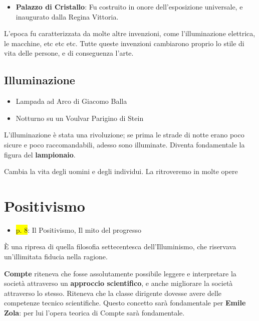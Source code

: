 \documentclass{book}
\newcommand{\pagine}[1]{\colorbox{yellow}{#1}}
\begin{document}
\begin{itemize}

\item
  \textbf{Palazzo di Cristallo}: Fu costruito in onore dell'esposizione
  universale, e inaugurato dalla Regina Vittoria.
\end{itemize}

L'epoca fu caratterizzata da molte altre invenzioni, come
l'illuminazione elettrica, le macchine, etc etc etc. Tutte queste
invenzioni cambiarono proprio lo stile di vita delle persone, e di
conseguenza l'arte.

\subsection{Illuminazione}

\begin{itemize}

\item
  Lampada ad Arco di Giacomo Balla
\item
  Notturno su un Voulvar Parigino di Stein
\end{itemize}

L'illuminazione è stata una rivoluzione; se prima le strade di notte
erano poco sicure e poco raccomandabili, adesso sono illuminate. Diventa
fondamentale la figura del \textbf{lampionaio}.

Cambia la vita degli uomini e degli individui. La ritroveremo in molte
opere

\section{Positivismo}

\begin{itemize}

\item
  \pagine{p. 8}: Il Positivismo, Il mito del progresso
\end{itemize}

È una ripresa di quella filosofia settecentesca dell'Illuminismo, che
riservava un'illimitata fiducia nella ragione.

\textbf{Compte} riteneva che fosse assolutamente possibile leggere e
interpretare la società attraverso un \textbf{approccio scientifico}, e
anche migliorare la società attraverso lo stesso. Riteneva che la classe
dirigente dovesse avere delle competenze tecnico scientifiche. Questo
concetto sarà fondamentale per \textbf{Emile Zola}: per lui l'opera
teorica di Compte sarà fondamentale.
\end{document}
